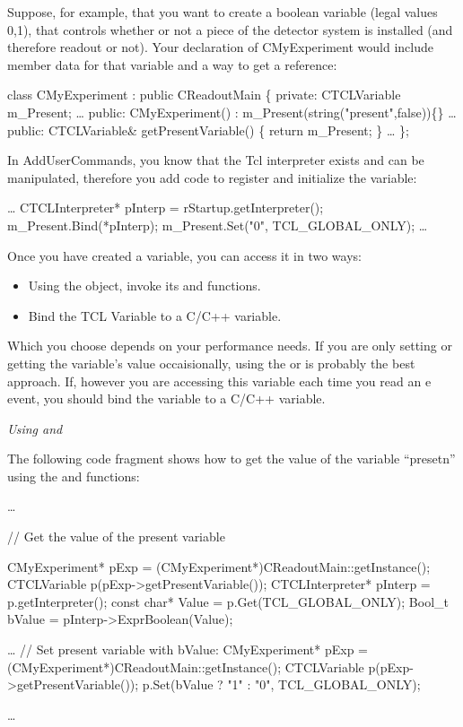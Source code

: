 	 Suppose, for example, that you want to create a 
	 boolean variable (legal values 0,1), that controls
	 whether or not a piece of the detector system is 
	 installed (and therefore readout or not).
	 Your declaration of CMyExperiment would include
	 member data for that variable and a way to get a
	 reference:
	 \begin{example}
	    class CMyExperiment : public CReadoutMain
	    \{
	       private:
		  CTCLVariable m_Present;
		  \ldots
	       public:
		  CMyExperiment() :
		     m_Present(string("present",false))\{\}
		  \ldots
	       public:
		  CTCLVariable& getPresentVariable() \{
		     return m_Present;
		  \}
		  \ldots
	    \};
	 \end{example}
	 In AddUserCommands, you know that the Tcl interpreter
	 exists and can be manipulated, therefore you add code
	 to register and initialize the variable:
	 
	 \begin{example}
	    \ldots
	       CTCLInterpreter* pInterp = rStartup.getInterpreter();
	       m_Present.Bind(*pInterp);
	       m_Present.Set("0", TCL_GLOBAL_ONLY);
	    \ldots
	 \end{example}
	 
	 Once you have created a variable, you can access it in
	 two ways:
	 \begin{itemize}
	    \item Using the object, invoke its 
	        and  functions.
	    \item Bind the TCL Variable to a C/C++ variable.
	 \end{itemize}
	 
	 Which you choose depends on your performance needs.
	 If you are only setting or getting the variable's value
	 occaisionally, using the  or 
	  is probably the best approach.  If, however
	 you are accessing this variable each time you read an e
	 event, you should bind the variable to a C/C++ variable.
	 
	 {\em Using  and }
	 
	 The following code fragment shows how to get the
	 value of the variable ``presetn'' using the
	  and  functions:
	 \begin{example}
	    \ldots
	    
	    // Get the value of the present variable
	       
	    CMyExperiment* pExp = 
	       (CMyExperiment*)CReadoutMain::getInstance();
	    CTCLVariable p(pExp->getPresentVariable());
	    CTCLInterpreter* pInterp = p.getInterpreter();
	    const char* Value = p.Get(TCL_GLOBAL_ONLY);
	    Bool_t bValue = pInterp->ExprBoolean(Value);
	       
	    \ldots
	    // Set present variable with bValue:
	    CMyExperiment* pExp = 
	       (CMyExperiment*)CReadoutMain::getInstance();
	    CTCLVariable p(pExp->getPresentVariable());
	    p.Set(bValue ? "1" : "0", TCL_GLOBAL_ONLY);
	    
	    \ldots
	 \end{example}
	 
